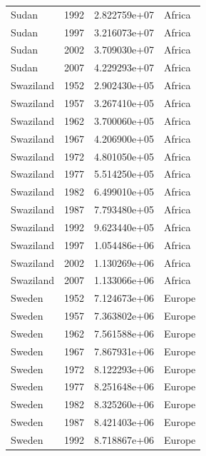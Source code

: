 \documentclass[
  letterpaper,
  DIV=11,
  numbers=noendperiod]{scrreprt}
\begin{document}
\begin{tcolorbox}
\begin{tabular}{lrrl}
Sudan                    &  1992 &  2.822759e+07 &    Africa \\
Sudan                    &  1997 &  3.216073e+07 &    Africa \\
Sudan                    &  2002 &  3.709030e+07 &    Africa \\
Sudan                    &  2007 &  4.229293e+07 &    Africa \\
Swaziland                &  1952 &  2.902430e+05 &    Africa \\
Swaziland                &  1957 &  3.267410e+05 &    Africa \\
Swaziland                &  1962 &  3.700060e+05 &    Africa \\
Swaziland                &  1967 &  4.206900e+05 &    Africa \\
Swaziland                &  1972 &  4.801050e+05 &    Africa \\
Swaziland                &  1977 &  5.514250e+05 &    Africa \\
Swaziland                &  1982 &  6.499010e+05 &    Africa \\
Swaziland                &  1987 &  7.793480e+05 &    Africa \\
Swaziland                &  1992 &  9.623440e+05 &    Africa \\
Swaziland                &  1997 &  1.054486e+06 &    Africa \\
Swaziland                &  2002 &  1.130269e+06 &    Africa \\
Swaziland                &  2007 &  1.133066e+06 &    Africa \\
Sweden                   &  1952 &  7.124673e+06 &    Europe \\
Sweden                   &  1957 &  7.363802e+06 &    Europe \\
Sweden                   &  1962 &  7.561588e+06 &    Europe \\
Sweden                   &  1967 &  7.867931e+06 &    Europe \\
Sweden                   &  1972 &  8.122293e+06 &    Europe \\
Sweden                   &  1977 &  8.251648e+06 &    Europe \\
Sweden                   &  1982 &  8.325260e+06 &    Europe \\
Sweden                   &  1987 &  8.421403e+06 &    Europe \\
Sweden                   &  1992 &  8.718867e+06 &    Europe \\

\end{tabular}
\end{tcolorbox}
\end{document}
